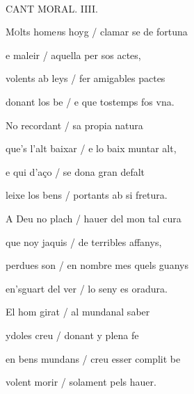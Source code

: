 \documentclass[12pt]{article}
\renewcommand{\espaiAbansEtiquetaPoema}{\vspace{0ex}}
\begin{document}
\begin{estrofa}

\espaiAbansEtiquetaPoema

\\

\begin{rubrica}

CANT MORAL. IIII.

\end{rubrica}

\end{estrofa}


\begin{estrofa}

 M\textsc{o}lts home\textit{n}s hoyg / clamar se de fortuna

 e maleir / aquella per sos actes,

 volents ab leys / fer amigables pactes

 donant los be / e que tostemps fos vna.

 No recordant / sa propia natura

 que's l'alt baixar / e lo baix muntar alt,

 e qui d'a\c{c}o / se dona gran defalt

 leixe los bens / portants ab si fretura.

\end{estrofa}



\begin{estrofa}

 A Deu no plach / hauer del mon tal cura

 que noy jaquis / de terribles affanys,

 perdues son / en nombre mes quels guanys

 en'sguart del ver / lo seny es oradura.

 El hom girat / al mundanal saber

 ydoles creu / donant y plena fe

 en bens mundans / creu esser complit be

 volent morir / solament pels hauer.

\end{estrofa}
\end{document}
